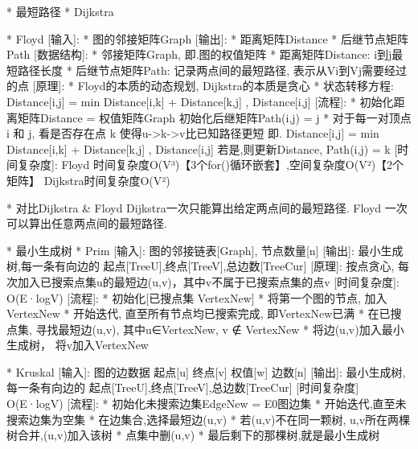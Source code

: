         * 最短路径
            * Dijkstra

            * Floyd
                [输入]:	* 图的邻接矩阵Graph
                [输出]: * 距离矩阵Distance	* 后继节点矩阵Path
                [数据结构]:
                    * 邻接矩阵Graph, 即.图的权值矩阵
                    * 距离矩阵Distance: i到j最短路径长度
                    * 后继节点矩阵Path: 记录两点间的最短路径, 表示从Vi到Vj需要经过的点
                [原理]:
                    * Floyd的本质的动态规划, Dijkstra的本质是贪心
                    * 状态转移方程:
                        Distance[i,j] = min{ Distance[i,k] + Distance[k,j] , Distance[i,j] }
                [流程]:
                    * 初始化距离矩阵Distance = 权值矩阵Graph
                        初始化后继矩阵Path(i,j) = j
                    * 对于每一对顶点 i 和 j, 看是否存在点 k 使得u->k->v比已知路径更短
                            即. Distance[i,j] = min{ Distance[i,k] + Distance[k,j] , Distance[i,j] }
                        若是,则更新Distance, Path(i,j) = k
                [时间复杂度]:
                    Floyd	时间复杂度O(V³)【3个for()循环嵌套】,空间复杂度O(V²)【2个矩阵】
                    Dijkstra时间复杂度O(V²)

            * 对比Dijkstra \& Floyd
                Dijkstra一次只能算出给定两点间的最短路径. 
                Floyd   一次可以算出任意两点间的最短路径. 

        * 最小生成树
            * Prim
                [输入]: 图的邻接链表[Graph], 节点数量[n]
                [输出]: 最小生成树,每一条有向边的 起点[TreeU],终点[TreeV],总边数[TreeCur]
                [原理]: 按点贪心, 每次加入已搜索点集u的最短边(u,v)，其中v不属于已搜索点集的点v
                [时间复杂度]: O(E·logV)
                [流程]:
                    * 初始化[已搜点集 VertexNew]
                    * 将第一个图的节点, 加入VertexNew
                    * 开始迭代, 直至所有节点均已搜索完成, 即VertexNew已满
                        * 在已搜点集, 寻找最短边(u,v), 其中u∈VertexNew, v ∉ VertexNew
                        * 将边(u,v)加入最小生成树， 将v加入VertexNew

            * Kruskal
                [输入]: 图的边数据 起点[u] 终点[v] 权值[w] 边数[n]
                [输出]: 最小生成树,每一条有向边的 起点[TreeU],终点[TreeV],总边数[TreeCur]
                [时间复杂度] O(E·logV)
                [流程]:
                    * 初始化未搜索边集EdgeNew = E0图边集
                    * 开始迭代,直至未搜索边集为空集
                        * 在边集合,选择最短边(u,v)
                        * 若(u,v)不在同一颗树, u,v所在两棵树合并,(u,v)加入该树
                        * 点集中删(u,v)
                    * 最后剩下的那棵树,就是最小生成树


